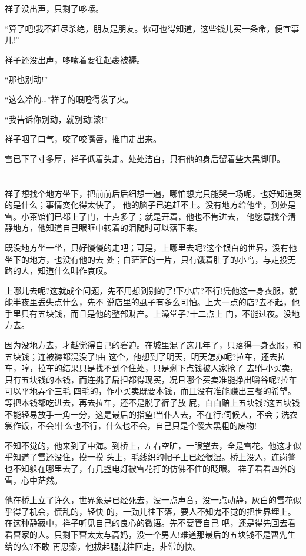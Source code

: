 \documentclass[11pt,a4paper,onecolumn]{article}
\begin{document}
祥子没出声，只剩了哆嗦。

``算了吧!我不赶尽杀绝，朋友是朋友。你可也得知道，这些钱儿买一条命，便宜事儿!''

祥子还没出声，哆嗦着要往起裹被褥。

``那也别动!''

``这么冷的\ldots ''祥子的眼瞪得发了火。

``我告诉你别动，就别动!滚!''

祥子咽了口气，咬了咬嘴唇，推门走出来。

雪已下了寸多厚，祥子低着头走。处处洁白，只有他的身后留着些大黑脚印。

\pagebreak
\section{}

祥子想找个地方坐下，把前前后后细想一遍，哪怕想完只能哭一场呢，也好知道哭的是什么；事情变化得太快了，
他的脑子已追赶不上。没有地方给他坐，到处是雪。小茶馆们已都上了门，十点多了；就是开着，他也不肯进去，
他愿意找个清静地方，他知道自己眼眶中转着的泪随时可以落下来。

既没地方坐一坐，只好慢慢的走吧；可是，上哪里去呢?这个银白的世界，没有他坐下的地方，也没有他的去
处；白茫茫的一片，只有饿着肚子的小鸟，与走投无路的人，知道什么叫作哀叹。

上哪儿去呢?这就成个问题，先不用想到别的了!下小店?不行!凭他这一身衣服，就能半夜里丢失点什么，先不
说店里的虱子有多么可怕。上大一点的店?去不起，他手里只有五块钱，而且是他的整部财产。上澡堂子?十二点上
门，不能过夜。没地方去。

因为没地方去，才越觉得自己的窘迫。在城里混了这几年了，只落得一身衣服，和五块钱；连被褥都混没了!由
这个，他想到了明天，明天怎办呢?拉车，还去拉车，哼，拉车的结果只是找不到个住处，只是剩下点钱被人家抢了
去!作小买卖，只有五块钱的本钱，而连挑子扁担都得现买，况且哪个买卖准能挣出嚼谷呢?拉车可以平地弄个三毛
四毛的，作小买卖既要本钱，而且没有准能赚出三餐的希望。等把本钱都吃进去，再去拉车，还不是脱了裤子放
屁，白白赔上五块钱?这五块钱不能轻易放手一角一分，这是最后的指望!当仆人去，不在行:伺候人，不会；洗衣
裳作饭，不会!什么也不行，什么也不会，自己只是个傻大黑粗的废物!

不知不觉的，他来到了中海。到桥上，左右空旷，一眼望去，全是雪花。他这才似乎知道了雪还没住，摸一摸
头上，毛线织的帽子上已经很湿。桥上没人，连岗警也不知躲在哪里去了，有几盏电灯被雪花打的仿佛不住的眨眼。
祥子看看四外的雪，心中茫然。

他在桥上立了许久，世界象是已经死去，没一点声音，没一点动静，灰白的雪花似乎得了机会，慌乱的，轻快
的，一劲儿往下落，要人不知鬼不觉的把世界埋上。在这种静寂中，祥子听见自己的良心的微语。先不要管自己
吧，还是得先回去看看曹家的人。只剩下曹太太与高妈，没一个男人!难道那最后的五块钱不是曹先生给的么?不敢
再思索，他拔起腿就往回走，非常的快。
\end{document}
